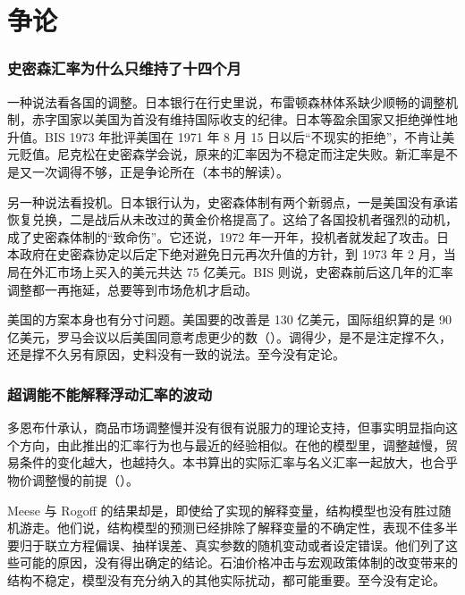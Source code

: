 \section{争论}\label{sec:floating-debate}

\subsubsection{史密森汇率为什么只维持了十四个月}

一种说法看各国的调整。日本银行在行史里说，布雷顿森林体系缺少顺畅的调整机制，赤字国家以美国为首没有维持国际收支的纪律\cite{boj1986}。日本等盈余国家又拒绝弹性地升值\cite{boj1986}。BIS 1973 年批评美国在 1971 年 8 月 15 日以后“不现实的拒绝”，不肯让美元贬值\cite{bis1973}。尼克松在史密森学会说，原来的汇率因为不稳定而注定失败\cite{nixon1971b}。新汇率是不是又一次调得不够，正是争论所在（本书的解读）。

另一种说法看投机。日本银行认为，史密森体制有两个新弱点，一是美国没有承诺恢复兑换，二是战后从未改过的黄金价格提高了\cite{boj1986}。这给了各国投机者强烈的动机，成了史密森体制的“致命伤”\cite{boj1986}。它还说，1972 年一开年，投机者就发起了攻击\cite{boj1986}。日本政府在史密森协定以后定下绝对避免日元再次升值的方针，到 1973 年 2 月，当局在外汇市场上买入的美元共达 75 亿美元\cite{boj1986}。BIS 则说，史密森前后这几年的汇率调整都一再拖延，总要等到市场危机才启动\cite{bis1973}。

美国的方案本身也有分寸问题。美国要的改善是 130 亿美元，国际组织算的是 90 亿美元，罗马会议以后美国同意考虑更少的数（）\cite{bis1972}。调得少，是不是注定撑不久，还是撑不久另有原因，史料没有一致的说法。至今没有定论。

\subsubsection{超调能不能解释浮动汇率的波动}

多恩布什承认，商品市场调整慢并没有很有说服力的理论支持，但事实明显指向这个方向，由此推出的汇率行为也与最近的经验相似\cite{dornbusch1976}。在他的模型里，调整越慢，贸易条件的变化越大，也越持久\cite{dornbusch1976}。本书算出的实际汇率与名义汇率一起放大，也合乎物价调整慢的前提（）。

Meese 与 Rogoff 的结果却是，即使给了实现的解释变量，结构模型也没有胜过随机游走\cite{meeserogoff1983}。他们说，结构模型的预测已经排除了解释变量的不确定性，表现不佳多半要归于联立方程偏误、抽样误差、真实参数的随机变动或者设定错误\cite{meeserogoff1983}。他们列了这些可能的原因，没有得出确定的结论\cite{meeserogoff1983}。石油价格冲击与宏观政策体制的改变带来的结构不稳定，模型没有充分纳入的其他实际扰动，都可能重要\cite{meeserogoff1983}。至今没有定论。

